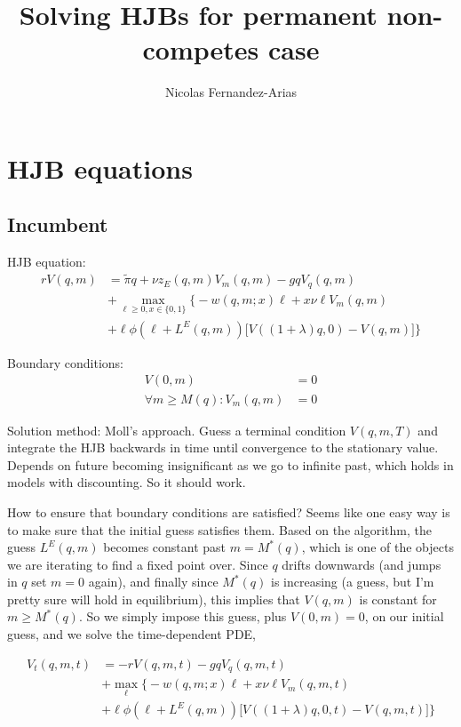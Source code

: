 \documentclass[12pt,english]{article}
\theoremstyle{remark}
\begin{document}
\title{Solving HJBs for permanent non-competes case}
\author{Nicolas Fernandez-Arias}
\maketitle

\section{HJB equations}
\subsection*{Incumbent}
HJB equation: 
\begin{align*}
rV(q,m) &= \tilde{\pi} q + \nu z_E(q,m) V_m(q,m) - gqV_q(q,m) \\
	   &+ \max_{\ell \ge 0, x \in \{0,1\}} \big\{ -w(q,m;x) \ell + x\nu \ell V_m (q,m)  \\ 
	   &+ \ell \phi (\ell + L^E(q,m))\big[V((1+\lambda)q,0)-V(q,m)\big] \big\} 
\end{align*}

Boundary conditions: 
\begin{align*}
V(0,m) &= 0 \\
\forall m \ge M(q): V_m(q,m) &= 0
\end{align*}

Solution method: Moll's approach. Guess a terminal condition $V(q,m,T)$ and integrate the HJB backwards in time until convergence to the stationary value. Depends on future becoming insignificant as we go to infinite past, which holds in models with discounting. So it should work. 

How to ensure that boundary conditions are satisfied? Seems like one easy way is to make sure that the initial guess satisfies them. Based on the algorithm, the guess $L^E(q,m)$ becomes constant past $m = M^* (q)$, which is one of the objects we are iterating to find a fixed point over. Since $q$ drifts downwards (and jumps in $q$ set $m = 0$ again), and finally since $M^*(q)$ is increasing (a guess, but I'm pretty sure will hold in equilibrium), this implies that $V(q,m)$ is constant for $m \ge M^*(q)$. So we simply impose this guess, plus $V(0,m) = 0$, on our initial guess, and we solve the time-dependent PDE, 

\begin{align*}
V_t(q,m,t) &= - rV(q,m,t) - gqV_q(q,m,t) \\
					&+ \max_{\ell} \big\{  -w(q,m;x)\ell + x\nu \ell V_m (q,m,t) \\
					&+ \ell \phi (\ell + L^E(q,m)) \big[ V((1+\lambda)q,0,t)- V(q,m,t)  \big] \big\}
\end{align*}
\end{document}
